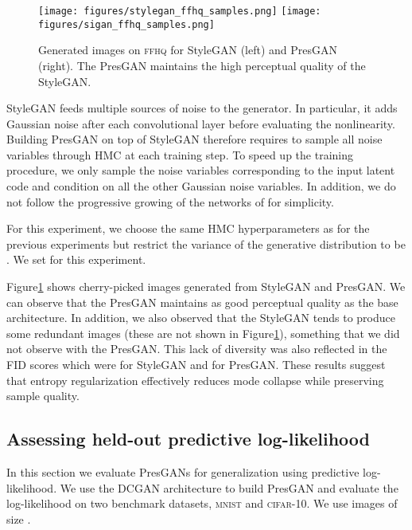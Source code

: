 \documentclass[11pt]{article}
\begin{document}
\begin{figure}[t]
	\texttt{[image: figures/stylegan\_ffhq\_samples.png]}\quad\quad\quad
	\texttt{[image: figures/sigan\_ffhq\_samples.png]}
	\caption{Generated images on \textsc{ffhq} for Style\gls{GAN} (left) and Pres\gls{GAN} (right). The Pres\gls{GAN} maintains the high perceptual quality of the Style\gls{GAN}.}
	\label{fig:ffhq}
\end{figure}

Style\gls{GAN} feeds multiple sources of noise  to the generator. In particular, it adds Gaussian noise after each convolutional layer before evaluating the nonlinearity. Building Pres\gls{GAN} on top of Style\gls{GAN} therefore requires to sample all noise variables  through \gls{HMC} at each training step. To speed up the training procedure, we only sample the noise variables corresponding to the input latent code and condition on all the other Gaussian noise variables. In addition, we do not follow the progressive growing of the networks of \citet{karras2019style} for simplicity.

For this experiment, we choose the same \gls{HMC} hyperparameters as for the previous experiments but restrict the variance of the generative distribution to be . We set  for this experiment. 

Figure\nobreakspace \ref {fig:ffhq} shows cherry-picked images generated from Style\gls{GAN} and Pres\gls{GAN}. We can observe that the Pres\gls{GAN} maintains as good perceptual quality as the base architecture. In addition, we also observed that the Style\gls{GAN} tends to produce some redundant images (these are not shown in Figure\nobreakspace \ref {fig:ffhq}), something that we did not observe with the Pres\gls{GAN}. This lack of diversity was also reflected in the \gls{FID} scores which were  for Style\gls{GAN} and  for Pres\gls{GAN}. These results suggest that entropy regularization effectively reduces mode collapse while preserving sample quality. 


\subsection{Assessing held-out predictive log-likelihood}
\label{subsec:assessing_log_lik}

In this section we evaluate Pres\glspl{GAN} for generalization using predictive log-likelihood. We use the \gls{DCGAN} architecture to build Pres\gls{GAN} and evaluate the log-likelihood on two benchmark datasets, \textsc{mnist} and \textsc{cifar}-10. We use images of size .
\end{document}
